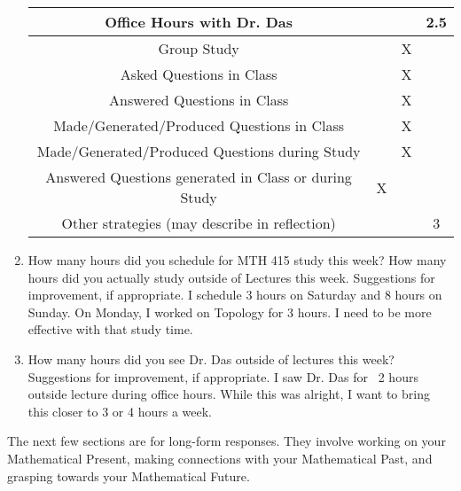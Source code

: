 \documentclass[10pt]{article}
\begin{document}
\begin{enumerate}
\begin{tabular}{|c|c|c|c|}

		Office Hours with Dr. Das &&&2.5\\
		\hline		
		Group Study&&X&\\
		\hline
		\hline
		Asked Questions in Class &&X&\\
		\hline
		Answered Questions in Class &&X&\\
		\hline
		\hline
		
		Made/Generated/Produced Questions in Class &&X&\\
		\hline
		Made/Generated/Produced Questions during Study &&X&\\
		\hline
		Answered Questions generated in Class or during Study &X&&\\
		\hline
		\hline
		
		Other strategies (may describe in reflection) &&&3\\
		\hline
		
			
	\end{tabular}

\item How many hours did you schedule for MTH 415 study this week? How many hours did you actually study outside of Lectures this week. Suggestions for improvement, if appropriate.
\vfill
I schedule 3 hours on Saturday and 8 hours on Sunday. On Monday, I worked on Topology for 3 hours. I need to be more effective with that study time.

\item How many hours did you see Dr. Das outside of lectures this week? Suggestions for improvement, if appropriate.
\vfill
I saw Dr. Das for ~2 hours outside lecture during office hours. While this was alright, I want to bring this closer to 3 or 4 hours a week.

\end{enumerate}

\newpage
The next few sections are for long-form responses. They involve working on your Mathematical Present, making connections with your Mathematical Past, and grasping towards your Mathematical Future.
\end{document}
